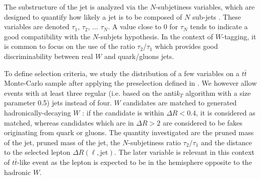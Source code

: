 
            The substructure of the jet is analyzed via the $N$-subjetiness variables,
            which are designed to quantify how likely a jet is to be composed of $N$
            sub-jets \cite{N-subjettiness}. These variables are denoted $\tau_1$,
            $\tau_2$, ... $\tau_N$. A value close to 0 for $\tau_N$ tends to indicate
            a good compatibility with the $N$-subjets hypothesis. In the context of
            $W$-tagging, it is common to focus on the use of the ratio $\tau_2/\tau_1$
            which provides good discriminability between real $W$ and quark/gluons jets.

            To define selection criteria, we study the distribution of a few variables
            on a $t\bar{t}$ Monte-Carlo sample after applying the preselection defined in
            . We however allow events with at
            least three regular (i.e. based on the anti$k_T$ algorithm with a size parameter 0.5) jets
            instead of four. $W$ candidates are matched to generated
            hadronically-decaying $W$ : if the candidate is within $\Delta R < 0.4$, it
            is considered as matched, whereas candidates which are in $\Delta R > 2$ are
            considered to be fakes originating from quark or gluons.
            The quantity investigated are the pruned mass of the jet,
            pruned mass of the jet, the $N$-subjetiness ratio $\tau_2 / \tau_1$ and the
            distance to the selected lepton $\Delta R (\ell,\text{jet})$. The later
            variable is relevant in this context of $t\bar{t}$-like event as the lepton
            is expected to be in the hemisphere opposite to the hadronic $W$.

